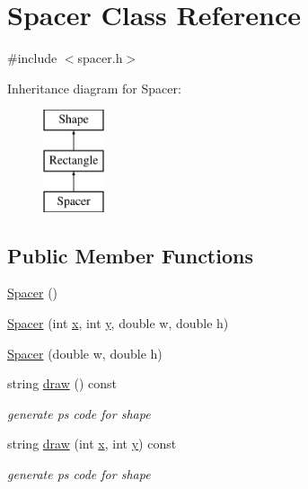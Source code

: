 \hypertarget{class_spacer}{}\section{Spacer Class Reference}
\label{class_spacer}


{\ttfamily \#include $<$spacer.\+h$>$}

Inheritance diagram for Spacer\+:\begin{figure}[H]
\begin{center}
\leavevmode
\includegraphics[height=3.000000cm]{class_spacer}
\end{center}
\end{figure}
\subsection*{Public Member Functions}
\begin{DoxyCompactItemize}
\item 
\hyperlink{class_spacer_a633ff31f694cbefad661ba67c0a4b11b}{Spacer} ()
\item 
\hyperlink{class_spacer_a358ef503c38bd3b6b370de2e8eb1b603}{Spacer} (int \hyperlink{class_shape_a41e403e73d2949f1a6adfba6032c41ec}{x}, int \hyperlink{class_shape_ac757f715cc5b5681f2c691663ac06f0a}{y}, double w, double h)
\item 
\hyperlink{class_spacer_a33874d4aa3de2963b2672e3b50a41eb2}{Spacer} (double w, double h)
\item 
string \hyperlink{class_spacer_a9f649a8e182a99584cfd8de8a90423f7}{draw} () const 
\begin{DoxyCompactList}\small\item\em generate ps code for shape \end{DoxyCompactList}\item 
string \hyperlink{class_spacer_a7c79d0ca6ccc80a08bdaa839c8e05b2f}{draw} (int \hyperlink{class_shape_a41e403e73d2949f1a6adfba6032c41ec}{x}, int \hyperlink{class_shape_ac757f715cc5b5681f2c691663ac06f0a}{y}) const 
\begin{DoxyCompactList}\small\item\em generate ps code for shape \end{DoxyCompactList}\end{DoxyCompactItemize}
